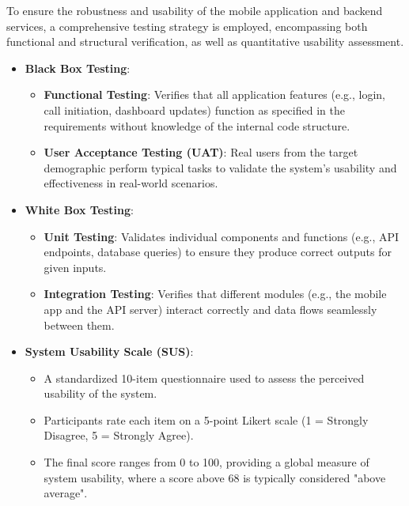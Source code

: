 To ensure the robustness and usability of the mobile application and backend services, a comprehensive testing strategy is employed, encompassing both functional and structural verification, as well as quantitative usability assessment.

\begin{itemize}
	\item \textbf{Black Box Testing}:
	\begin{itemize}
		\item \textbf{Functional Testing}: Verifies that all application features (e.g., login, call initiation, dashboard updates) function as specified in the requirements without knowledge of the internal code structure.
		\item \textbf{User Acceptance Testing (UAT)}: Real users from the target demographic perform typical tasks to validate the system's usability and effectiveness in real-world scenarios.
	\end{itemize}
	\item \textbf{White Box Testing}:
	\begin{itemize}
		\item \textbf{Unit Testing}: Validates individual components and functions (e.g., API endpoints, database queries) to ensure they produce correct outputs for given inputs.
		\item \textbf{Integration Testing}: Verifies that different modules (e.g., the mobile app and the API server) interact correctly and data flows seamlessly between them.
	\end{itemize}
	\item \textbf{System Usability Scale (SUS)}:
	\begin{itemize}
		\item A standardized 10-item questionnaire used to assess the perceived usability of the system.
		\item Participants rate each item on a 5-point Likert scale (1 = Strongly Disagree, 5 = Strongly Agree).
		\item The final score ranges from 0 to 100, providing a global measure of system usability, where a score above 68 is typically considered "above average".
	\end{itemize}
\end{itemize}